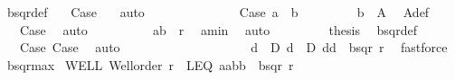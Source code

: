 \begin{isabellebody}
\ bsqr{\isacharunderscore}{\kern0pt}def\ \isamarkupfalse%
\ {}\ Case{}\ {}\ \isamarkupfalse%
\ auto\isanewline
\ \ \ \ \ \isamarkupfalse%
\isanewline
\ \ \ \ \ \ \ \isamarkupfalse%
\ Case{}{}{\isacharcolon}{\kern0pt}\ {\isachardoublequoteopen}a{}\ {\isacharequal}{\kern0pt}\ b{}{\isachardoublequoteclose}\isanewline
\ \ \ \ \ \ \ \isamarkupfalse%
\ {\isachardoublequoteopen}b{}\ {\isasymin}\ A{}{\isachardoublequoteclose}\ \isamarkupfalse%
\ A{}{\isacharunderscore}{\kern0pt}def\ \isamarkupfalse%
\ {}\ {\isacharasterisk}{\kern0pt}{\isacharasterisk}{\kern0pt}{\isacharasterisk}{\kern0pt}\ Case{}\ \isamarkupfalse%
\ auto\isanewline
\ \ \ \ \ \ \ \isamarkupfalse%
\ {}{\isacharcolon}{\kern0pt}\ {\isachardoublequoteopen}{\isacharparenleft}{\kern0pt}a{}{\isacharcomma}{\kern0pt}b{}{\isacharparenright}{\kern0pt}\ {\isasymin}\ r{\isachardoublequoteclose}\ \isamarkupfalse%
\ a{}{\isacharunderscore}{\kern0pt}min\ \isamarkupfalse%
\ auto\isanewline
\ \ \ \ \ \ \ \isamarkupfalse%
\ {\isacharquery}{\kern0pt}thesis\ \isamarkupfalse%
\ bsqr{\isacharunderscore}{\kern0pt}def\ \isamarkupfalse%
\ {}\ {}\ Case{}\ Case{}{}\ \isamarkupfalse%
\ auto\isanewline
\ \ \ \ \ \isamarkupfalse%
\isanewline
\ \ \ \isamarkupfalse%
\isanewline
\ \ \isacommand{{\isacharbraceright}{\kern0pt}}\isamarkupfalse%
\isanewline
\ \ \isanewline
\ \ \isamarkupfalse%
\ \isamarkupfalse%
\ {\isachardoublequoteopen}{\isasymexists}d\ {\isasymin}\ D{\isachardot}{\kern0pt}\ {\isasymforall}d{\isacharprime}{\kern0pt}\ {\isasymin}\ D{\isachardot}{\kern0pt}\ {\isacharparenleft}{\kern0pt}d{\isacharcomma}{\kern0pt}d{\isacharprime}{\kern0pt}{\isacharparenright}{\kern0pt}\ {\isasymin}\ bsqr\ r{\isachardoublequoteclose}\ \isamarkupfalse%
\ fastforce\isanewline
{}\isamarkupfalse%
%
\endisatagproof
{\isafoldproof}%
%
\isadelimproof
\isanewline
%
\endisadelimproof
\isanewline
{}\isamarkupfalse%
\ bsqr{\isacharunderscore}{\kern0pt}max{}{\isacharcolon}{\kern0pt}\isanewline
{}\ WELL{\isacharcolon}{\kern0pt}\ {\isachardoublequoteopen}Well{\isacharunderscore}{\kern0pt}order\ r{\isachardoublequoteclose}\ \ LEQ{\isacharcolon}{\kern0pt}\ {\isachardoublequoteopen}{\isacharparenleft}{\kern0pt}{\isacharparenleft}{\kern0pt}a{}{\isacharcomma}{\kern0pt}a{}{\isacharparenright}{\kern0pt}{\isacharcomma}{\kern0pt}{\isacharparenleft}{\kern0pt}b{}{\isacharcomma}{\kern0pt}b{}{\isacharparenright}{\kern0pt}{\isacharparenright}{\kern0pt}\ {\isasymin}\ bsqr\ r{\isachardoublequoteclose}\isanewline

\end{isabellebody}
